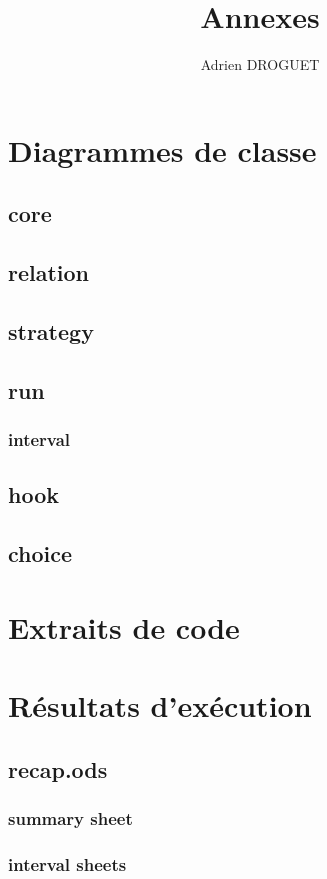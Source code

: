 \documentclass[a4paper,10pt]{report}
\title{Annexes}
\author{Adrien DROGUET}
\begin{document}
\maketitle

\tableofcontents
\pagebreak

\chapter{Diagrammes de classe}

\section{core}

\section{relation}

\section{strategy}

\section{run}

\subsection{interval}

\section{hook}

\section{choice}

\chapter{Extraits de code}

\chapter{Résultats d'exécution}

\section{recap.ods}
\subsection{summary sheet}


\subsection{interval sheets}

\end{document}
